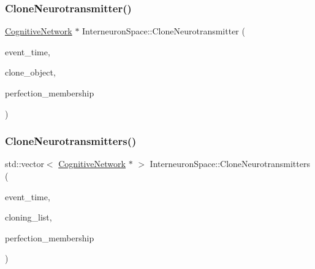 \mbox{\label{classInterneuronSpace_a96149bba4c6efd03586700a6fe86960a}} 
\subsubsection{\texorpdfstring{Clone\+Neurotransmitter()}{CloneNeurotransmitter()}}
{\footnotesize\ttfamily \mbox{\hyperlink{classCognitiveNetwork}{Cognitive\+Network}} $\ast$ Interneuron\+Space\+::\+Clone\+Neurotransmitter (\begin{DoxyParamCaption}\item[{std\+::chrono\+::time\+\_\+point$<$ \mbox{\hyperlink{universe_8h_a0ef8d951d1ca5ab3cfaf7ab4c7a6fd80}{Clock}} $>$}]{event\+\_\+time,  }\item[{\mbox{\hyperlink{classCognitiveNetwork}{Cognitive\+Network}} $\ast$}]{clone\+\_\+object,  }\item[{double}]{perfection\+\_\+membership }\end{DoxyParamCaption})}

\mbox{\label{classInterneuronSpace_a3defddf17eb839dbd799980f6116f895}} 
\subsubsection{\texorpdfstring{Clone\+Neurotransmitters()}{CloneNeurotransmitters()}}
{\footnotesize\ttfamily std\+::vector$<$ \mbox{\hyperlink{classCognitiveNetwork}{Cognitive\+Network}} $\ast$ $>$ Interneuron\+Space\+::\+Clone\+Neurotransmitters (\begin{DoxyParamCaption}\item[{std\+::chrono\+::time\+\_\+point$<$ \mbox{\hyperlink{universe_8h_a0ef8d951d1ca5ab3cfaf7ab4c7a6fd80}{Clock}} $>$}]{event\+\_\+time,  }\item[{std\+::vector$<$ \mbox{\hyperlink{classCognitiveNetwork}{Cognitive\+Network}} $\ast$$>$}]{cloning\+\_\+list,  }\item[{double}]{perfection\+\_\+membership }\end{DoxyParamCaption})}

